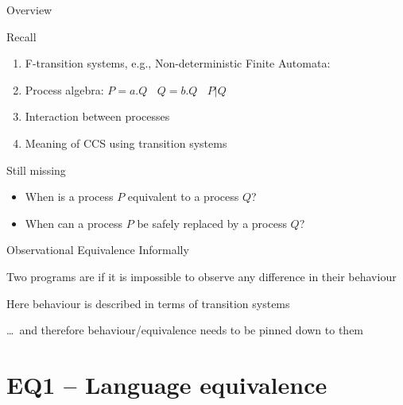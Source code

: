 \documentclass[aspectratio=169]{beamer}
\begin{document}
\begin{slide}{Overview}

\begin{block}{Recall}
\begin{enumerate}
  \item F-transition systems, e.g., Non-deterministic Finite Automata:
  \item Process algebra:
    $P = a.Q ~~~~ Q=b.Q ~~~~ P|Q$

  \item Interaction between processes
  
  \item Meaning of CCS using transition systems

\end{enumerate}  
\end{block}

\begin{block}{Still missing}
\begin{itemize}
  \item When is a process $P$ \alert{equivalent} to a process $Q$?
  \item When can a process $P$ be \alert{safely replaced} by a process $Q$?
\end{itemize}
\end{block}
\end{slide}


\begin{frame}{Observational Equivalence Informally}

  Two programs are  if it is impossible to \alert{observe any
  difference} in their \alert{behaviour}

  
  \vfill
  Here behaviour is described in terms of transition systems

  \dots\ and therefore behaviour/equivalence needs to be pinned
  down to them
\end{frame}

\section{EQ1 -- Language equivalence}
\end{document}
